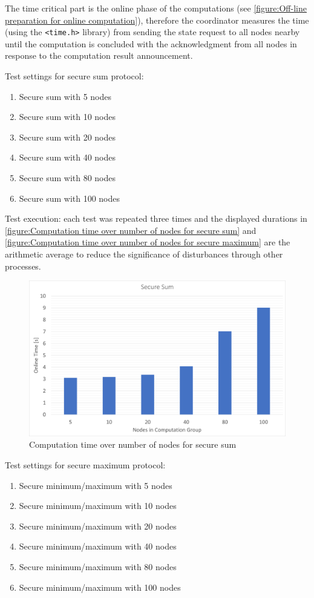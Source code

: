 The time critical part is the online phase of the computations (see \autoref{figure:Off-line preparation for online computation}), therefore the coordinator measures the time (using the \lstinline|<time.h>| library) from sending the state request to all nodes nearby until the computation is concluded with the acknowledgment from all nodes in response to the computation result announcement.

Test settings for secure sum protocol:
\begin{enumerate}
	\item Secure sum with 5 nodes
	\item Secure sum with 10 nodes
	\item Secure sum with 20 nodes
	\item Secure sum with 40 nodes
	\item Secure sum with 80 nodes
	\item Secure sum with 100 nodes
\end{enumerate}

Test execution: each test was repeated three times and the displayed durations in \autoref{figure:Computation time over number of nodes for secure sum} and \autoref{figure:Computation time over number of nodes for secure maximum} are the arithmetic average to reduce the significance of disturbances through other processes.

\begin{figure}[!htbp] %
	\caption{Computation time over number of nodes for secure sum} \label{figure:Computation time over number of nodes for secure sum}
	\includegraphics[scale=1.0]{figures/eval_sum.png}
\end{figure}

Test settings for secure maximum protocol:
\begin{enumerate}
	\item Secure minimum/maximum with 5 nodes
	\item Secure minimum/maximum with 10 nodes
	\item Secure minimum/maximum with 20 nodes
	\item Secure minimum/maximum with 40 nodes
	\item Secure minimum/maximum with 80 nodes
	\item Secure minimum/maximum with 100 nodes
\end{enumerate}


